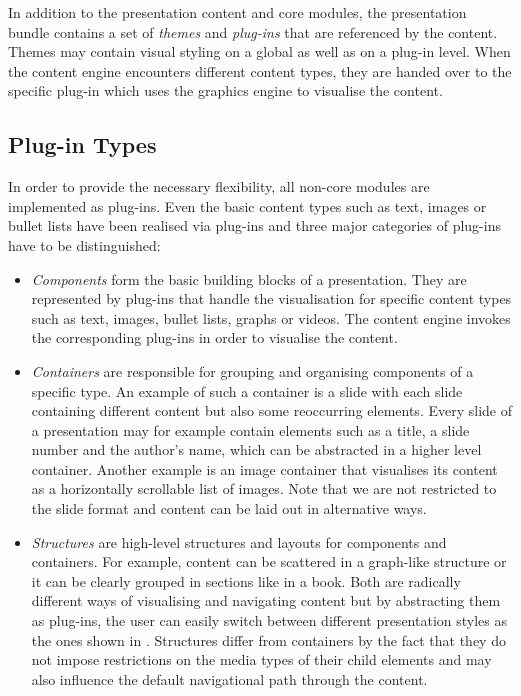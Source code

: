     In addition to the presentation content and core modules, the presentation
    bundle contains a set of \emph{themes} and \emph{plug-ins} that are
    referenced by the content. Themes may contain visual styling on a global as
    well as on a plug-in level. When the content engine encounters different
    content types, they are handed over to the specific plug-in which uses the
    graphics engine to visualise the content.

   \subsection{Plug-in Types}


    In order to provide the necessary flexibility, all non-core modules are
    implemented as plug-ins. Even the basic content types such as text, images
    or bullet lists have been realised via plug-ins and three major categories
    of plug-ins have to be distinguished:

    \begin{itemize}

     \item \emph{Components} form the basic building blocks of a presentation.
     They are represented by plug-ins that handle the visualisation for
     specific content types such as text, images, bullet lists, graphs or
     videos. The content engine invokes the corresponding plug-ins in order to
     visualise the content.

     \item \emph{Containers} are responsible for grouping and organising
     components of a specific type. An example of such a container is a slide
     with each slide containing different content but also some reoccurring
     elements.  Every slide of a presentation may for example contain elements
     such as a title, a slide number and the author's name, which can be
     abstracted in a higher level container. Another example is an image
     container that visualises its content as a horizontally scrollable list of
     images. Note that we are not restricted to the slide format and content
     can be laid out in alternative ways.

     \item \emph{Structures} are high-level structures and layouts for
     components and containers. For example, content can be scattered in a
     graph-like structure or it can be clearly grouped in sections like in a
     book.  Both are radically different ways of visualising and navigating
     content but by abstracting them as plug-ins, the user can easily switch
     between different presentation styles as the ones shown in
     . Structures differ from containers by the fact that
     they do not impose restrictions on the media types of their child elements
     and may also influence the default navigational path through the content.

    \end{itemize}

